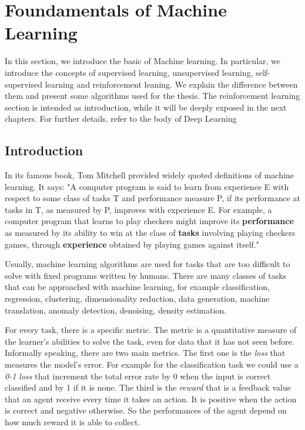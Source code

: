 
\chapter{Foundamentals of Machine Learning} %

\label{Chapter2} %

In this section, we introduce the basic of Machine learning.
In particular, we introduce the concepts of supervised learning, unsupervised learning, self-supervised learning and reinforcement leaning. 
We explain the difference between them and present some algorithms used for the thesis.
The reinforcement learning section is intended as introduction, while it will be deeply exposed in the next chapters.
For further details, refer to the body of Deep Learning\cite{goodfellow2016deep} 

\section{Introduction}

In its famous book, Tom Mitchell \cite{Mitchell97} provided widely quoted definitions of machine learning.
It says: "A computer program is said to learn from experience E with respect to some class of tasks T and performance measure P, if its performance at tasks in T, as measured by P, improves with experience E. For example, a computer program that learns to play checkers might improve its \textbf{performance} as measured by its ability to win at the class of \textbf{tasks} involving playing checkers games, through \textbf{experience} obtained by playing games against
itself."

Usually, machine learning algorithms are used for tasks that are too difficult to solve with fixed programs written by humans.
There are many classes of tasks that can be approached with machine learning, for example classification, regression, clustering, dimensionality reduction, data generation, machine translation, anomaly detection, denoising, density estimation.


For every task, there is a specific metric. The metric is a quantitative measure of the learner's abilities to solve the task, even for data that it has not seen before.   
Informally speaking, there are two main metrics.
The first one is the \textit{loss} that measures the model's error. For example for the classification task we could use a \textit{0-1 loss} that increment the total error rate by 0 when the input is correct classified and by 1 if it is none. 
The third is the \textit{reward} that is a feedback value that an agent receive every time it takes an action. It is positive when the action is correct and negative otherwise. So the performances of the agent depend on how much reward it is able to collect.

